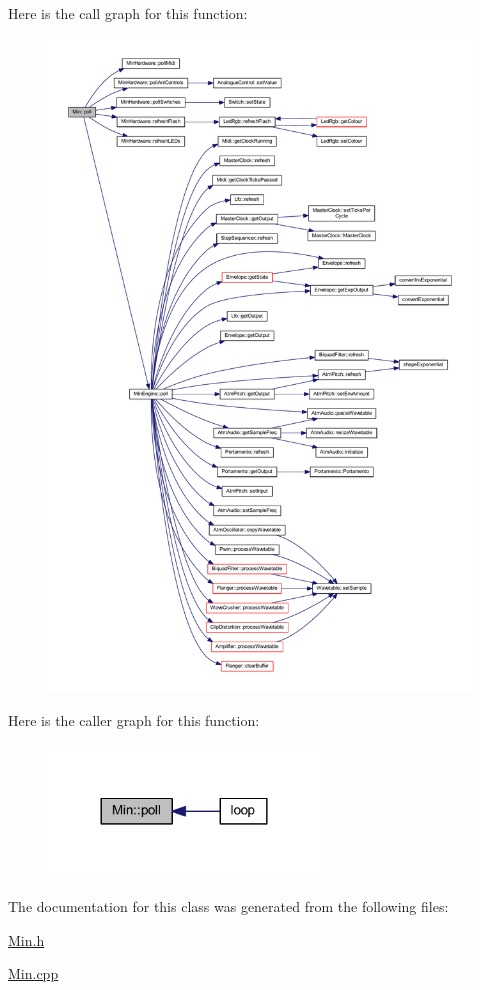 Here is the call graph for this function\+:
\nopagebreak
\begin{figure}[H]
\begin{center}
\leavevmode
\includegraphics[width=350pt]{class_min_a4ed53c28c8c59dba741daf945dbc160b_cgraph}
\end{center}
\end{figure}
Here is the caller graph for this function\+:
\nopagebreak
\begin{figure}[H]
\begin{center}
\leavevmode
\includegraphics[width=204pt]{class_min_a4ed53c28c8c59dba741daf945dbc160b_icgraph}
\end{center}
\end{figure}


The documentation for this class was generated from the following files\+:\begin{DoxyCompactItemize}
\item 
\hyperlink{_min_8h}{Min.\+h}\item 
\hyperlink{_min_8cpp}{Min.\+cpp}\end{DoxyCompactItemize}
